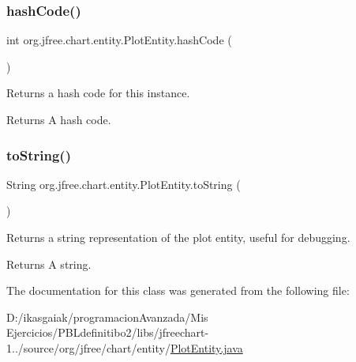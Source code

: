 \subsubsection{\texorpdfstring{hash\+Code()}{hashCode()}}
{\footnotesize\ttfamily int org.\+jfree.\+chart.\+entity.\+Plot\+Entity.\+hash\+Code (\begin{DoxyParamCaption}{ }\end{DoxyParamCaption})}

Returns a hash code for this instance.

\begin{DoxyReturn}{Returns}
A hash code. 
\end{DoxyReturn}
\mbox{\label{classorg_1_1jfree_1_1chart_1_1entity_1_1_plot_entity_a1eba11b30586682d32571c8d7c678816}} 
\subsubsection{\texorpdfstring{to\+String()}{toString()}}
{\footnotesize\ttfamily String org.\+jfree.\+chart.\+entity.\+Plot\+Entity.\+to\+String (\begin{DoxyParamCaption}{ }\end{DoxyParamCaption})}

Returns a string representation of the plot entity, useful for debugging.

\begin{DoxyReturn}{Returns}
A string. 
\end{DoxyReturn}


The documentation for this class was generated from the following file\+:\begin{DoxyCompactItemize}
\item 
D\+:/ikasgaiak/programacion\+Avanzada/\+Mis Ejercicios/\+P\+B\+Ldefinitibo2/libs/jfreechart-\/1../source/org/jfree/chart/entity/\mbox{\hyperlink{_plot_entity_8java}{Plot\+Entity.\+java}}\end{DoxyCompactItemize}
